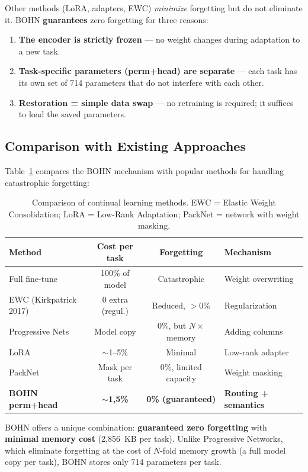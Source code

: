 \documentclass[11pt,a4paper]{report}
\begin{document}
Other methods (LoRA, adapters, EWC) \emph{minimize} forgetting but do not eliminate it. BOHN \textbf{guarantees} zero forgetting for three reasons:

\begin{enumerate}
    \item \textbf{The encoder is strictly frozen} --- no weight changes during adaptation to a new task.
    \item \textbf{Task-specific parameters (perm+head) are separate} --- each task has its own set of 714 parameters that do not interfere with each other.
    \item \textbf{Restoration = simple data swap} --- no retraining is required; it suffices to load the saved parameters.
\end{enumerate}

\subsection{Comparison with Existing Approaches}

Table~\ref{tab:continual_comparison} compares the BOHN mechanism with popular methods for handling catastrophic forgetting:

\begin{table}[htbp]
\centering
\caption{Comparison of continual learning methods. EWC = Elastic Weight Consolidation; LoRA = Low-Rank Adaptation; PackNet = network with weight masking.}
\label{tab:continual_comparison}
\begin{tabular}{l|c|c|l}
\hline
\textbf{Method} & \textbf{Cost per task} & \textbf{Forgetting} & \textbf{Mechanism} \\
\hline
Full fine-tune & 100\% of model & Catastrophic & Weight overwriting \\
EWC (Kirkpatrick 2017) & 0 extra (regul.) & Reduced, $>$0\% & Regularization \\
Progressive Nets & Model copy & 0\%, but $N\times$ memory & Adding columns \\
LoRA & $\sim$1--5\% & Minimal & Low-rank adapter \\
PackNet & Mask per task & 0\%, limited capacity & Weight masking \\
\textbf{BOHN perm+head} & \textbf{$\sim$1{,}5\%} & \textbf{0\% (guaranteed)} & \textbf{Routing + semantics} \\
\hline
\end{tabular}
\end{table}

BOHN offers a unique combination: \textbf{guaranteed zero forgetting} with \textbf{minimal memory cost} (2{,}856~KB per task). Unlike Progressive Networks, which eliminate forgetting at the cost of $N$-fold memory growth (a full model copy per task), BOHN stores only 714 parameters per task.
\end{document}
